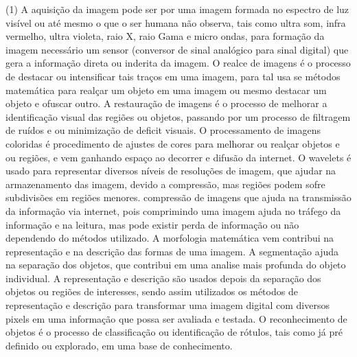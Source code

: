 \documentclass[12pt,a4paper]{article}
\begin{document}
\begin{solution}
    \begin{tasks}(1)
        \task A aquisição da imagem pode ser por uma imagem formada no espectro
        de luz visível ou até mesmo o que o ser humana não observa, tais como
        ultra som, infra vermelho, ultra violeta, raio X, raio Gama e micro
        ondas, para formação da imagem necessário um sensor (conversor de sinal
        analógico para sinal digital) que gera a informação direta ou inderita
        da imagem.
        \task O realce de imagens é o processo de destacar ou intensificar tais
        traços em uma imagem, para tal usa se métodos matemática para realçar um
        objeto em uma imagem ou mesmo destacar um objeto e ofuscar outro.
        \task A restauração de imagens é o processo de melhorar a identificação
        visual das regiões ou objetos, passando por um processo de filtragem de
        ruídos e ou minimização de deficit visuais.
        \task O processamento de imagens coloridas é procedimento de ajustes de
        cores para melhorar ou realçar objetos e ou regiões, e vem ganhando
        espaço ao decorrer e difusão da internet.
        \task O wavelets é usado para representar diversos níveis de resoluções
        de imagem, que ajudar na armazenamento das imagem, devido a compressão,
        mas regiões podem sofre subdivisões em regiões menores.
        \task compressão de imagens que ajuda na transmissão da informação via
        internet, pois comprimindo uma imagem ajuda no tráfego da informação e
        na leitura, mas pode existir perda de informação ou não dependendo do
        métodos utilizado.
        \task A morfologia matemática vem contribui na representação e na
        descrição das formas de uma imagem.
        \task A segmentação ajuda na separação dos objetos, que contribui em uma
        analise mais profunda do objeto individual.
        \task A representação e descrição são usados depois da separação dos
        objetos ou regiões de interesses, sendo assim utilizados os métodos de
        representação e descrição para transformar uma imagem digital com
        diversos pixels em uma informação que possa ser avaliada e testada.
        \task O reconhecimento de objetos é o processo de classificação ou
        identificação de rótulos, tais como já pré definido ou explorado, em uma
        base de conhecimento.
    \end{tasks}
\end{solution}
\end{document}
